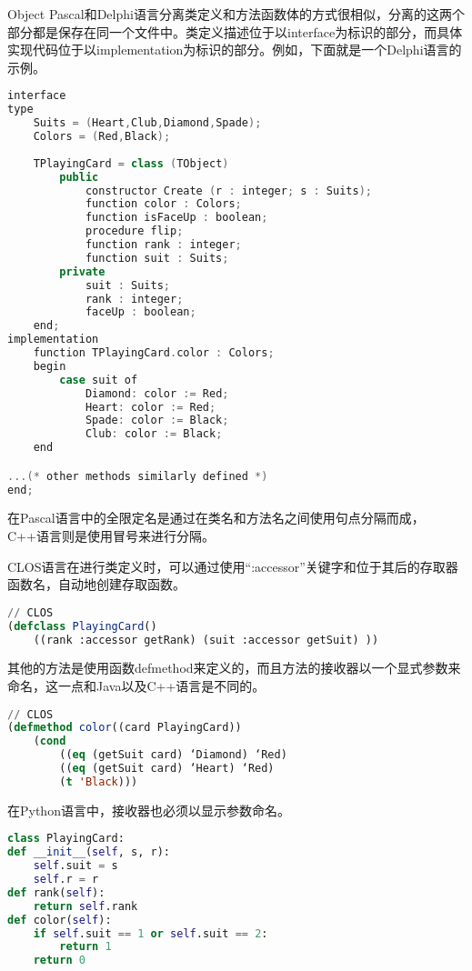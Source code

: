 Object Pascal和Delphi语言分离类定义和方法函数体的方式很相似，分离的这两个部分都是保存在同一个文件中。类定义描述位于以interface为标识的部分，而具体实现代码位于以implementation为标识的部分。例如，下面就是一个Delphi语言的示例。


\begin{lstlisting}[language=C++]
interface
type
	Suits = (Heart,Club,Diamond,Spade);
	Colors = (Red,Black);
	
	TPlayingCard = class (TObject)
		public
			constructor Create (r : integer; s : Suits);
			function color : Colors;
			function isFaceUp : boolean;
			procedure flip;
			function rank : integer;
			function suit : Suits;
		private
			suit : Suits;
			rank : integer;
			faceUp : boolean;
	end;	
implementation
	function TPlayingCard.color : Colors;
	begin
		case suit of
			Diamond: color := Red;	
			Heart: color := Red;
			Spade: color := Black;
			Club: color := Black;
	end

...(* other methods similarly defined *)
end;
\end{lstlisting}



在Pascal语言中的全限定名是通过在类名和方法名之间使用句点分隔而成，C++语言则是使用冒号来进行分隔。

CLOS语言在进行类定义时，可以通过使用“:accessor”关键字和位于其后的存取器函数名，自动地创建存取函数。


\begin{lstlisting}[language=Lisp]
// CLOS
(defclass PlayingCard()
	((rank :accessor getRank) (suit :accessor getSuit) ))
\end{lstlisting}

其他的方法是使用函数defmethod来定义的，而且方法的接收器以一个显式参数来命名，这一点和Java以及C++语言是不同的。





\begin{lstlisting}[language=Lisp]
// CLOS
(defmethod color((card PlayingCard))
	(cond
		((eq (getSuit card) ‘Diamond) ‘Red)
		((eq (getSuit card) ‘Heart) ‘Red)
		(t 'Black)))
\end{lstlisting}

在Python语言中，接收器也必须以显示参数命名。




\begin{lstlisting}[language=Python]
class PlayingCard:
def __init__(self, s, r):
	self.suit = s
	self.r = r
def rank(self):
	return self.rank
def color(self):
	if self.suit == 1 or self.suit == 2:
		return 1
	return 0
\end{lstlisting}


